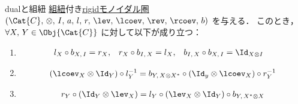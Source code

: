 \documentclass[TQFT_main]{subfiles}
\begin{document}
\begin{mylem}[label=lem:dual-braid]{dualと組紐}
    \hyperref[redef:braided-monoidal]{組紐}付き\hyperref[redef:rigid]{rigidモノイダル圏} $(\Cat{C},\, \otimes,\, I,\, a,\, l,\, r,\, \lev,\, \lcoev,\, \rev,\, \rcoev,\, b)$ を与える．
    このとき，$\forall X,\, Y \in \Obj{\Cat{C}}$ に対して以下が成り立つ：
    \begin{enumerate}
        \item 
        \begin{align}
            l_X \circ b_{X,\, I} &= r_X, 
            &
            r_X \circ b_{I,\, X} &= l_X, 
            &
            b_{I,\, X} \circ b_{X,\, I} &= \Id_{X \otimes I}
        \end{align}
        \item 
        \begin{align}
            (\lcoev_X \otimes \Id_Y) \circ l_Y^{-1} = b_{Y,\, X \otimes X^*} \circ (\Id_y \otimes \lcoev_X) \circ r_Y^{-1}
        \end{align}
        \item 
        \begin{align}
            r_Y \circ (\Id_Y \otimes \lev_X)  = l_Y \circ (\lev_X \otimes \Id_Y) \circ b_{Y,\, X^* \otimes X}
        \end{align}
    \end{enumerate}
\end{mylem}
\end{document}
